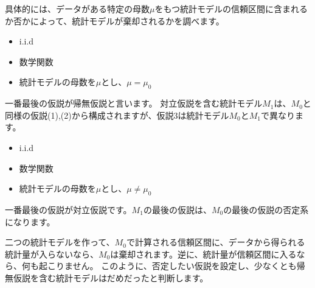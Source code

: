 具体的には、データがある特定の母数$\mu$をもつ統計モデルの信頼区間に含まれるか否かによって、統計モデルが棄却されるかを調べます。
\begin{itemize}
    \item i.i.d
    \item 数学関数
    \item 統計モデルの母数を$\mu$とし、$\mu=\mu_0$
\end{itemize}
一番最後の仮説が帰無仮説と言います。
対立仮説を含む統計モデル$M_1$は、$M_0$と同様の仮説(1),(2)から構成されますが、仮説3は統計モデル$M_0$と$M_1$で異なります。
\begin{itemize}
    \item i.i.d
    \item 数学関数
    \item 統計モデルの母数を$\mu$とし、$\mu\neq\mu_0$
\end{itemize}
一番最後の仮説が対立仮説です。$M_1$の最後の仮説は、$M_0$の最後の仮説の否定系になります。

二つの統計モデルを作って、$M_0$で計算される信頼区間に、データから得られる統計量が入らないなら、$M_0$は棄却されます。逆に、統計量が信頼区間に入るなら、何も起こりません。
このように、否定したい仮説を設定し、少なくとも帰無仮説を含む統計モデルはだめだったと判断します。

